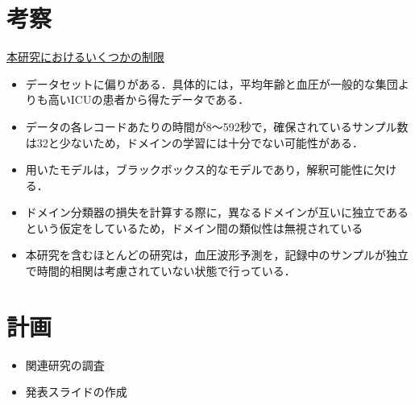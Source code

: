 \documentclass[dvipdfmx]{jsarticle}
\begin{document}
\section{考察}
\underline{本研究におけるいくつかの制限}
\begin{itemize}
    \item データセットに偏りがある．具体的には，平均年齢と血圧が一般的な集団よりも高いICUの患者から得たデータである．
    \item データの各レコードあたりの時間が8～592秒で，確保されているサンプル数は32と少ないため，ドメインの学習には十分でない可能性がある．
    \item 用いたモデルは，ブラックボックス的なモデルであり，解釈可能性に欠ける．
    \item ドメイン分類器の損失を計算する際に，異なるドメインが互いに独立であるという仮定をしているため，ドメイン間の類似性は無視されている
    \item 本研究を含むほとんどの研究は，血圧波形予測を，記録中のサンプルが独立で時間的相関は考慮されていない状態で行っている．
\end{itemize}
\section{計画}
\begin{itemize}
    \item 関連研究の調査
    \item 発表スライドの作成
\end{itemize}
\end{document}
